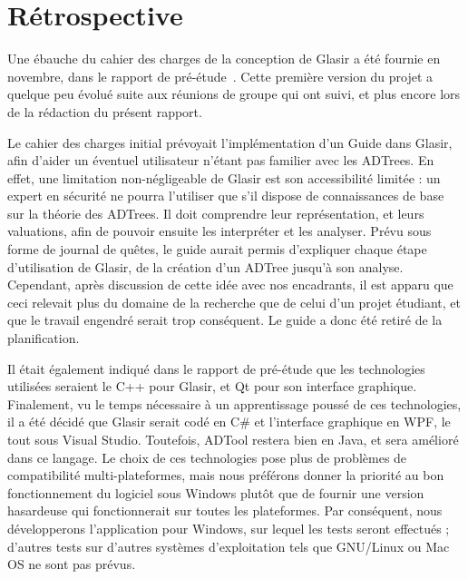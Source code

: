 \section{Rétrospective}
    \label{sec:retro}

    Une ébauche du cahier des charges de la conception de Glasir a été fournie en novembre, dans le rapport de pré-étude~\cite{pre_etude}. Cette première version du projet a quelque peu évolué suite aux réunions de groupe qui ont suivi, et plus encore lors de la rédaction du présent rapport.

    Le cahier des charges initial prévoyait l'implémentation d'un \og Guide \fg{} dans Glasir, afin d'aider un éventuel utilisateur n'étant pas familier avec les ADTrees. En effet, une limitation non-négligeable de Glasir est son accessibilité limitée : un expert en sécurité ne pourra l'utiliser que s'il dispose de connaissances de base sur la théorie des ADTrees. Il doit comprendre leur représentation, et leurs valuations, afin de pouvoir ensuite les interpréter et les analyser. Prévu sous forme de journal de quêtes, le guide aurait permis d'expliquer chaque étape d'utilisation de Glasir, de la création d'un ADTree jusqu'à son analyse. Cependant, après discussion de cette idée avec nos encadrants, il est apparu que ceci relevait plus du domaine de la recherche que de celui d'un projet étudiant, et que le travail engendré serait trop conséquent. Le guide a donc été retiré de la planification.

    Il était également indiqué dans le rapport de pré-étude que les technologies utilisées seraient le C++ pour Glasir, et Qt pour son interface graphique. Finalement, vu le temps nécessaire à un apprentissage poussé de ces technologies, il a été décidé que Glasir serait codé en C\# et l'interface graphique en WPF, le tout sous Visual Studio. Toutefois, ADTool restera bien en Java, et sera amélioré dans ce langage. Le choix de ces technologies pose plus de problèmes de compatibilité multi-plateformes, mais nous préférons donner la priorité au bon fonctionnement du logiciel sous Windows plutôt que de fournir une version hasardeuse qui fonctionnerait sur toutes les plateformes. Par conséquent, nous développerons l'application pour Windows, sur lequel les tests seront effectués ; d'autres tests sur d'autres systèmes d'exploitation tels que GNU/Linux ou Mac OS ne sont pas prévus.